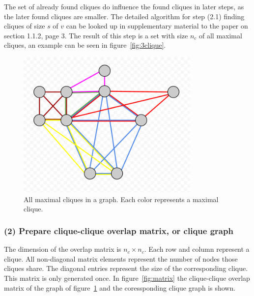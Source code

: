 \documentclass[runningheads,a4paper]{llncs}
\begin{document}
The set of already found cliques do influence the found cliques in later steps, as the later found cliques are smaller.
The detailed algorithm for step (2.1) finding cliques of size $s$ of $v$ can be looked up in supplementary material to the paper on section 1.1.2, page 3.
The result of this step is a set with size $n_c$ of all maximal cliques, an example can be seen in figure~\ref{fig:3clique}.

\begin{figure}
\begin{center}
	\includegraphics[width=0.8\textwidth]{allmaxcliques.png}
		\caption{All maximal cliques in a graph. Each color represents a maximal clique.}
		\label{fig:allmaxcliques}
\end{center}
\end{figure}

\subsubsection{(2) Prepare clique-clique overlap matrix, or clique graph}
The dimension of the overlap matrix is $n_c \times n_c$. Each row and column represent a clique.
All non-diagonal matrix elements represent the number of nodes those cliques share.
The diagonal entries represent the size of the corresponding clique.
This matrix is only generated once.
In figure~\ref{fig:matrix} the clique-clique overlap matrix of the graph of figure~\ref{fig:allmaxcliques} and the coressponding clique graph is shown.
\end{document}
